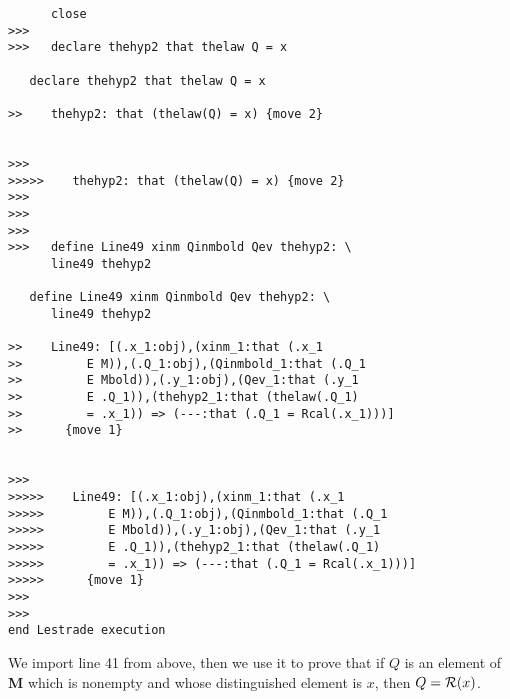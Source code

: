 \documentclass[12pt]{article}
\begin{document}
\begin{verbatim}
      close
>>>
>>>   declare thehyp2 that thelaw Q = x

   declare thehyp2 that thelaw Q = x

>>    thehyp2: that (thelaw(Q) = x) {move 2}


>>>
>>>>>    thehyp2: that (thelaw(Q) = x) {move 2}
>>>
>>>
>>>
>>>   define Line49 xinm Qinmbold Qev thehyp2: \
      line49 thehyp2

   define Line49 xinm Qinmbold Qev thehyp2: \
      line49 thehyp2

>>    Line49: [(.x_1:obj),(xinm_1:that (.x_1
>>         E M)),(.Q_1:obj),(Qinmbold_1:that (.Q_1
>>         E Mbold)),(.y_1:obj),(Qev_1:that (.y_1
>>         E .Q_1)),(thehyp2_1:that (thelaw(.Q_1)
>>         = .x_1)) => (---:that (.Q_1 = Rcal(.x_1)))]
>>      {move 1}


>>>
>>>>>    Line49: [(.x_1:obj),(xinm_1:that (.x_1
>>>>>         E M)),(.Q_1:obj),(Qinmbold_1:that (.Q_1
>>>>>         E Mbold)),(.y_1:obj),(Qev_1:that (.y_1
>>>>>         E .Q_1)),(thehyp2_1:that (thelaw(.Q_1)
>>>>>         = .x_1)) => (---:that (.Q_1 = Rcal(.x_1)))]
>>>>>      {move 1}
>>>
>>>
end Lestrade execution
\end{verbatim}

We import line 41 from above, then we use it to prove that if $Q$ is an element of {\bf M} which is nonempty and whose distinguished element is $x$,
then $Q = {\cal R}(x)$.
\end{document}
